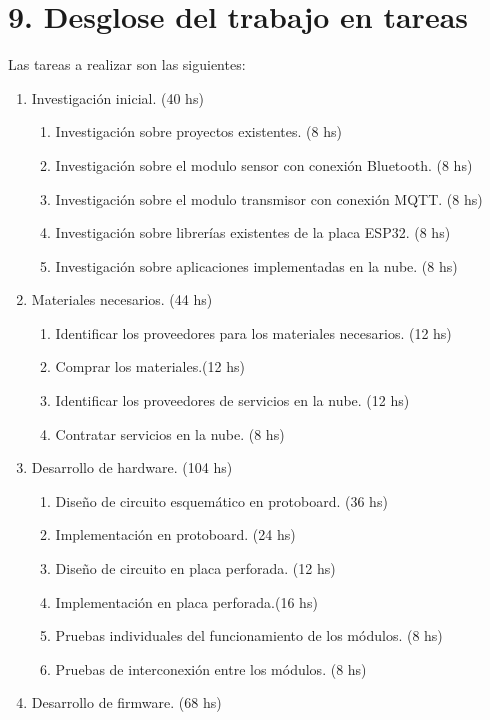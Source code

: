 \documentclass[
11pt, %
]{charter}
\begin{document}
\section{9. Desglose del trabajo en tareas}
\label{sec:wbs}

Las tareas a realizar son las siguientes:

\begin{enumerate}
\item Investigación inicial. (40 hs)
	\begin{enumerate}
	\item Investigación sobre proyectos existentes.	(8 hs)
	\item Investigación sobre el modulo sensor con conexión Bluetooth. (8 hs)
	\item Investigación sobre el modulo transmisor con conexión MQTT. (8 hs)
	\item Investigación sobre librerías existentes de la placa ESP32. (8 hs)
	\item Investigación sobre aplicaciones implementadas en la nube. (8 hs)
	\end{enumerate}
\item Materiales necesarios. (44 hs)
	\begin{enumerate}
	\item Identificar los proveedores para los materiales necesarios. (12 hs)
	\item Comprar los materiales.(12 hs)
	\item Identificar los proveedores de servicios en la nube. (12 hs)
	\item Contratar servicios en la nube. (8 hs)
	\end{enumerate}
\item Desarrollo de hardware. (104 hs)
	\begin{enumerate}
	\item Diseño de circuito esquemático en protoboard. (36 hs)
	\item Implementación en protoboard. (24 hs)
	\item Diseño de circuito en placa perforada. (12 hs)
	\item Implementación en placa perforada.(16 hs)
	\item Pruebas individuales del funcionamiento de los módulos. (8 hs)
	\item Pruebas de interconexión entre los módulos. (8 hs)
	\end{enumerate}
\item Desarrollo de firmware. (68 hs)
	\begin{enumerate}

\end{enumerate}
\end{enumerate}
\end{document}
